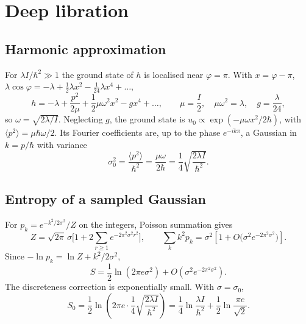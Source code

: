 \documentclass[preprint,12pt]{elsarticle}
\begin{document}
\section{Deep libration}
\label{sec:libration}

\subsection{Harmonic approximation}

For $\lambda I/\hbar^{2}\gg1$ the ground state of $h$ is localised near
$\varphi=\pi$. With $x=\varphi-\pi$,
$\lambda\cos\varphi=-\lambda+\tfrac12\lambda x^{2}-\tfrac{1}{24}\lambda x^{4}+\dots$,
\begin{equation}
h=-\lambda+\frac{p^{2}}{2\mu}+\frac12\mu\omega^{2}x^{2}-gx^{4}+\dots,\qquad
\mu=\frac{I}{2},\quad \mu\omega^{2}=\lambda,\quad g=\frac{\lambda}{24},
\label{eq:hho}
\end{equation}
so $\omega=\sqrt{2\lambda/I}$. Neglecting $g$, the ground state is
$u_{0}\propto\exp(-\mu\omega x^{2}/2\hbar)$, with
$\langle p^{2}\rangle=\mu\hbar\omega/2$. Its Fourier coefficients are, up to the
phase $e^{-ik\pi}$, a Gaussian in $k=p/\hbar$ with variance
\begin{equation}
\sigma_{0}^{2}=\frac{\langle p^{2}\rangle}{\hbar^{2}}=\frac{\mu\omega}{2\hbar}
=\frac14\sqrt{\frac{2\lambda I}{\hbar^{2}}} .
\label{eq:sigma0}
\end{equation}

\subsection{Entropy of a sampled Gaussian}

For $p_{k}=e^{-k^{2}/2\sigma^{2}}/Z$ on the integers, Poisson summation gives
\begin{equation}
Z=\sqrt{2\pi}\,\sigma\Big[1+2\sum_{r\ge1}e^{-2\pi^{2}\sigma^{2}r^{2}}\Big],\qquad
\sum_{k}k^{2}p_{k}=\sigma^{2}\left[1+O\big(\sigma^{2}e^{-2\pi^{2}\sigma^{2}}\big)\right].
\end{equation}
Since
$-\ln p_{k}=\ln Z+k^{2}/2\sigma^{2}$,
\begin{equation}
S=\frac12\ln\left(2\pi e\sigma^{2}\right)
+O\!\left(\sigma^{2}e^{-2\pi^{2}\sigma^{2}}\right).
\end{equation}
The discreteness correction is exponentially small. With $\sigma=\sigma_{0}$,
\begin{equation}
S_{0}=\frac12\ln\left(2\pi e\cdot\frac14\sqrt{\frac{2\lambda I}{\hbar^{2}}}\right)
=\frac14\ln\frac{\lambda I}{\hbar^{2}}+\frac12\ln\frac{\pi e}{\sqrt2}.
\end{equation}
\end{document}
